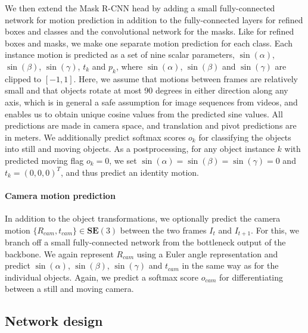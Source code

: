 We then extend the Mask R-CNN head by adding a small fully-connected network for motion
prediction in addition to the fully-connected layers for
refined boxes and classes and the convolutional network for the masks.
Like for refined boxes and masks, we make one separate motion prediction for each class.
Each instance motion is predicted as a set of nine scalar parameters,
$\sin(\alpha)$, $\sin(\beta)$, $\sin(\gamma)$, $t_k$ and $p_k$,
where $\sin(\alpha)$, $\sin(\beta)$ and $\sin(\gamma)$ are clipped to $[-1, 1]$.
Here, we assume that motions between frames are relatively small
and that objects rotate at most 90 degrees in either direction along any axis,
which is in general a safe assumption for image sequences from videos,
and enables us to obtain unique cosine values from the predicted sine values.
All predictions are made in camera space, and translation and pivot predictions are in meters.
We additionally predict softmax scores $o_k$ for classifying the objects into
still and moving objects. As a postprocessing, for any object instance $k$ with predicted moving flag $o_k = 0$,
we set $\sin(\alpha) = \sin(\beta) = \sin(\gamma) = 0$ and $t_k = (0,0,0)^T$,
and thus predict an identity motion.


\paragraph{Camera motion prediction}
In addition to the object transformations, we optionally predict the camera motion $\{R_{cam}, t_{cam}\}\in \mathbf{SE}(3)$
between the two frames $I_t$ and $I_{t+1}$.
For this, we branch off a small fully-connected network from the bottleneck output of the backbone.
We again represent $R_{cam}$ using a Euler angle representation and
predict $\sin(\alpha)$, $\sin(\beta)$, $\sin(\gamma)$ and $t_{cam}$ in the same way as for the individual objects.
Again, we predict a softmax score $o_{cam}$ for differentiating between
a still and moving camera.

\subsection{Network design}

\label{ssec:design}

